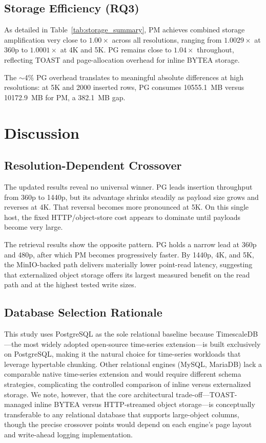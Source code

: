 \documentclass[conference, a4paper]{IEEEtran}
\begin{document}
\subsection{Storage Efficiency (RQ3)}
\label{subsec:storage_size}
As detailed in Table~\ref{tab:storage_summary}, PM achieves combined storage amplification very close to $1.00\times$ across all resolutions, ranging from $1.0029\times$ at 360p to $1.0001\times$ at 4K and 5K. PG remains close to $1.04\times$ throughout, reflecting TOAST and page-allocation overhead for inline BYTEA storage.

The $\sim$4\% PG overhead translates to meaningful absolute differences at high resolutions: at 5K and 2000 inserted rows, PG consumes 10555.1~MB versus 10172.9~MB for PM, a 382.1~MB gap.


\section{Discussion}
\label{sec:discussion}

\subsection{Resolution-Dependent Crossover}
The updated results reveal no universal winner. PG leads insertion throughput from 360p to 1440p, but its advantage shrinks steadily as payload size grows and reverses at 4K. That reversal becomes more pronounced at 5K. On this single host, the fixed HTTP/object-store cost appears to dominate until payloads become very large.

The retrieval results show the opposite pattern. PG holds a narrow lead at 360p and 480p, after which PM becomes progressively faster. By 1440p, 4K, and 5K, the MinIO-backed path delivers materially lower point-read latency, suggesting that externalized object storage offers its largest measured benefit on the read path and at the highest tested write sizes.

\subsection{Database Selection Rationale}
This study uses PostgreSQL as the sole relational baseline because TimescaleDB---the most widely adopted open-source time-series extension---is built exclusively on PostgreSQL, making it the natural choice for time-series workloads that leverage hypertable chunking. Other relational engines (MySQL, MariaDB) lack a comparable native time-series extension and would require different schema strategies, complicating the controlled comparison of inline versus externalized storage. We note, however, that the core architectural trade-off---TOAST-managed inline BYTEA versus HTTP-streamed object storage---is conceptually transferable to any relational database that supports large-object columns, though the precise crossover points would depend on each engine's page layout and write-ahead logging implementation.
\end{document}
